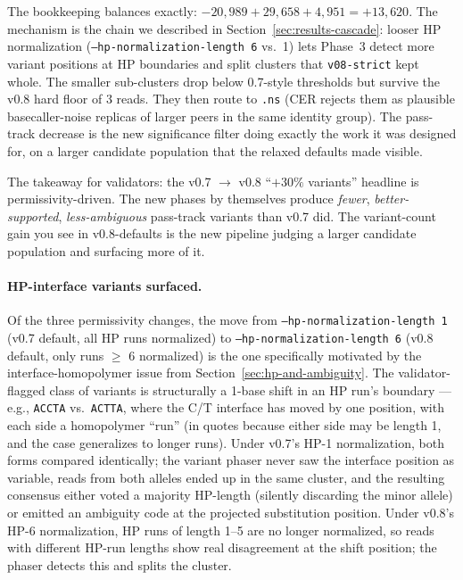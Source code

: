 \documentclass[11pt]{article}
\begin{document}
The bookkeeping balances exactly: $-20{,}989 + 29{,}658 + 4{,}951 =
+13{,}620$. The mechanism is the chain we described in
Section~\ref{sec:results-cascade}: looser HP normalization
(\texttt{--hp-normalization-length 6} vs.~1) lets Phase~3 detect more
variant positions at HP boundaries and split clusters that
\texttt{v08-strict} kept whole. The smaller sub-clusters drop below
0.7-style thresholds but survive the v0.8 hard floor of 3 reads. They
then route to \texttt{.ns} (CER rejects them as plausible
basecaller-noise replicas of larger peers in the same identity group).
The pass-track decrease is the new significance filter doing exactly
the work it was designed for, on a larger candidate population that the
relaxed defaults made visible.

The takeaway for validators: the v0.7 $\to$ v0.8 ``$+30\%$ variants''
headline is permissivity-driven. The new phases by themselves produce
\emph{fewer}, \emph{better-supported}, \emph{less-ambiguous} pass-track
variants than v0.7 did. The variant-count gain you see in
v0.8-defaults is the new pipeline judging a larger candidate population
and surfacing more of it.

\paragraph{HP-interface variants surfaced.} Of the three permissivity
changes, the move from \texttt{--hp-normalization-length 1} (v0.7
default, all HP runs normalized) to \texttt{--hp-normalization-length
6} (v0.8 default, only runs $\geq$ 6 normalized) is the one specifically
motivated by the interface-homopolymer issue from
Section~\ref{sec:hp-and-ambiguity}. The validator-flagged class of
variants is structurally a 1-base shift in an HP run's boundary ---
e.g., \texttt{ACCTA} vs.~\texttt{ACTTA}, where the C/T interface has
moved by one position, with each side a homopolymer ``run'' (in
quotes because either side may be length 1, and the case generalizes
to longer runs). Under v0.7's HP-1 normalization, both forms compared
identically; the variant phaser never saw the interface position as
variable, reads from both alleles ended up in the same cluster, and
the resulting consensus either voted a majority HP-length (silently
discarding the minor allele) or emitted an ambiguity code at the
projected substitution position. Under v0.8's HP-6 normalization, HP
runs of length 1--5 are no longer normalized, so reads with different
HP-run lengths show real disagreement at the shift position; the
phaser detects this and splits the cluster.
\end{document}
